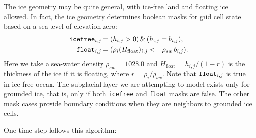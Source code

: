 \documentclass[11pt,final]{amsart}
\begin{document}
The ice geometry may be quite general, with ice-free land and floating ice allowed.  In fact, the ice geometry determines boolean masks for grid cell state based on a sea level of elevation zero:
\begin{align*}
\text{\texttt{icefree}}_{i,j} &= (h_{i,j} > 0)\, \&\, (h_{i,j} = b_{i,j}), \\
\text{\texttt{float}}_{i,j}   &= (\rho_i (H_{\text{float}})_{i,j} < - \rho_{sw}\, b_{i,j}).
\end{align*}
Here we take a sea-water density $\rho_{sw}=1028.0$ and $H_{\text{float}}=h_{i,j} / (1 - r)$  is the thickness of the ice if it is floating, where $r=\rho_i / \rho_{sw}$.  Note that $\text{\texttt{float}}_{i,j}$ is true in ice-free ocean.  The subglacial layer we are attempting to model exists only for grounded ice, that is, only if both \texttt{icefree} and \texttt{float} masks are false.  The other mask cases provide boundary conditions when they are neighbors to grounded ice cells.

One time step follows this algorithm:
\end{document}
